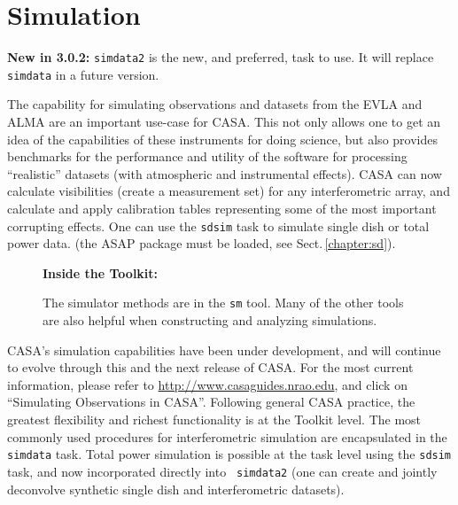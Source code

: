 
\chapter[Appendix: Simulation]{Simulation}
\label{chapter:sim}

{\bfseries New in 3.0.2:} {\tt simdata2} is the new, and preferred,
task to use.  It will replace {\tt simdata} in a future version.

The capability for simulating observations and datasets from the EVLA
and ALMA are an important use-case for CASA.  This not only allows one
to get an idea of the capabilities of these instruments for doing
science, but also provides benchmarks for the performance and utility
of the software for processing ``realistic'' datasets (with
atmospheric and instrumental effects).  CASA can now calculate
visibilities (create a measurement set) for any interferometric array,
and calculate and apply calibration tables representing some of the
most important corrupting effects.  One can use the {\tt sdsim} task
to simulate single dish or total power data.  (the ASAP package must
be loaded, see Sect.\,\ref{chapter:sd}).

\begin{wrapfigure}{r}{2.5in}
 \begin{boxedminipage}{2.5in}
    \centerline{\bf Inside the Toolkit:}
    The simulator methods are in the {\tt sm} tool.
    Many of the other tools are also helpful when
    constructing and analyzing simulations.
 \end{boxedminipage}
\end{wrapfigure}

CASA's simulation capabilities have been under development, and will
continue to evolve through this and the next release of CASA.
For the most current information, please refer to
\url{http://www.casaguides.nrao.edu}, and click on ``Simulating
Observations in CASA''.
%
Following general CASA practice, the greatest flexibility and richest
functionality is at the Toolkit level.  The most commonly used
procedures for interferometric simulation are encapsulated in the {\tt
simdata} task.  Total power simulation is possible at the task level
using the {\tt sdsim} task, and now incorporated directly into {\tt
simdata2} (one can create and jointly deconvolve synthetic single dish
and interferometric datasets).

